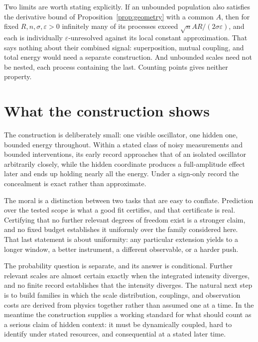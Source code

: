 \documentclass[10pt]{article}
\newcounter{claim}
\newcommand{\eps}{\varepsilon}
\begin{document}
Two limits are worth stating explicitly. If an unbounded population also
satisfies the derivative bound of Proposition~\ref{prop:geometry} with a common
$A$, then for fixed $R,n,\sigma,\eps>0$ infinitely many of its processes exceed
$\sqrt n AR/(2\sigma\eps)$, and each is individually $\eps$-unresolved against
its local constant approximation. That says nothing about their combined signal:
superposition, mutual coupling, and total energy would need a separate
construction. And unbounded scales need not be nested, each process containing
the last. Counting points gives neither property.

\section*{What the construction shows}
The construction is deliberately small: one visible oscillator, one hidden one,
bounded energy throughout. Within a stated class of noisy measurements and
bounded interventions, its early record approaches that of an isolated
oscillator arbitrarily closely, while the hidden coordinate produces a
full-amplitude effect later and ends up holding nearly all the energy. Under a
sign-only record the concealment is exact rather than approximate.

The moral is a distinction between two tasks that are easy to conflate.
Prediction over the tested scope is what a good fit certifies, and that
certificate is real. Certifying that no further relevant degrees of freedom
exist is a stronger claim, and no fixed budget establishes it uniformly over the
family considered here. That last statement is about uniformity: any particular
extension yields to a longer window, a better instrument, a different
observable, or a harder push.

The probability question is separate, and its answer is conditional. Further
relevant scales are almost certain exactly when the integrated intensity
diverges, and no finite record establishes that the intensity diverges. The
natural next step is to build families in which the scale distribution,
couplings, and observation costs are derived from physics together rather than
assumed one at a time. In the meantime the construction supplies a working
standard for what should count as a serious claim of hidden context: it must be
dynamically coupled, hard to identify under stated resources, and consequential
at a stated later time.
\end{document}
